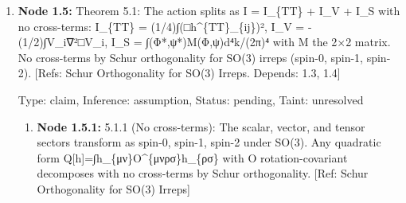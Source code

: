 \documentclass{article}
\begin{document}
\begin{enumerate}
\begin{enumerate}
  Type: claim, Inference: assumption, Status: pending, Taint: unresolved

\item \textbf{Node 1.4.4:} 4.1.4 (Vector R): R=∂\_μ∂\_νh\textasciicircum{}\{μν\}-□h. h\textasciicircum{}\{00\}=0, h\textasciicircum{}\{0i\}=-V\_i, h\textasciicircum{}\{ij\}=0. ∂\_μ∂\_νh\textasciicircum{}\{μν\}=-2∂\_i∂\_0V\_i=0 (transversality). □h=0. Hence R=0. ✓

  Type: claim, Inference: assumption, Status: pending, Taint: unresolved

\item \textbf{Node 1.4.5:} 4.2.1-4.2.4 (Tensor sector): Set h\_\{ij\}=h\textasciicircum{}\{TT\}\_\{ij\}, h\_\{00\}=h\_\{0i\}=0. R\_\{00\}: h\textasciicircum{}0\_0=h\textasciicircum{}i\_0=0, both terms vanish. R\_\{0i\}: ∂\_j∂\_0h\textasciicircum{}\{TT\}\_\{ji\}=∂\_0(∂\_jh\textasciicircum{}\{TT\}\_\{ji\})=0 by transversality. R\_\{ij\}: 2R\_\{ij\}=∂\_k∂\_ih\textasciicircum{}\{TT\}\_\{kj\}+∂\_k∂\_jh\textasciicircum{}\{TT\}\_\{ki\}-∂\_i∂\_jh\textasciicircum{}\{TT\}\_\{kk\}-□h\textasciicircum{}\{TT\}\_\{ij\}. First two: transversality→0. Third: tracelessness→0. Hence R\_\{ij\}=-(1/2)□h\textasciicircum{}\{TT\}\_\{ij\}. R: ∂\_i∂\_jh\textasciicircum{}\{TT\}\_\{ij\}=0 (transversality²), □(h\textasciicircum{}\{TT\}\_\{ii\})=0 (tracelessness). ✓ QED.

  Type: claim, Inference: assumption, Status: pending, Taint: unresolved

\end{enumerate}
\item \textbf{Node 1.5:} Theorem 5.1: The action splits as I = I\_\{TT\} + I\_V + I\_S with no cross-terms: I\_\{TT\} = (1/4)∫(□h\textasciicircum{}\{TT\}\_\{ij\})², I\_V = -(1/2)∫V\_i∇²□V\_i, I\_S = ∫(Φ*,ψ*)M(Φ,ψ)d⁴k/(2π)⁴ with M the 2×2 matrix. No cross-terms by Schur orthogonality for SO(3) irreps (spin-0, spin-1, spin-2). [Refs: Schur Orthogonality for SO(3) Irreps. Depends: 1.3, 1.4]

  Type: claim, Inference: assumption, Status: pending, Taint: unresolved

\begin{enumerate}
\item \textbf{Node 1.5.1:} 5.1.1 (No cross-terms): The scalar, vector, and tensor sectors transform as spin-0, spin-1, spin-2 under SO(3). Any quadratic form Q[h]=∫h\_\{μν\}O\textasciicircum{}\{μνρσ\}h\_\{ρσ\} with O rotation-covariant decomposes with no cross-terms by Schur orthogonality. [Ref: Schur Orthogonality for SO(3) Irreps]


\end{enumerate}
\end{enumerate}
\end{document}
